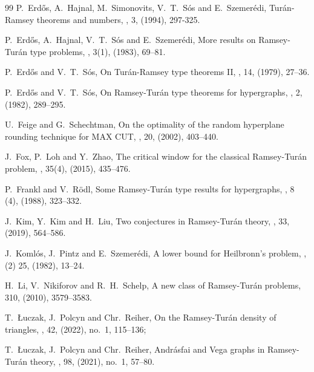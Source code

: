 \documentclass[11pt, a4paper]{article}
\theoremstyle{definition}
\begin{document}
\begin{thebibliography}{99}
P.~Erd\H os, A.~Hajnal, M.~Simonovits, V.~T.~S\'os and E.~Szemer\'edi,
\newblock Tur\'an-Ramsey theorems and  numbers,
, 3, (1994), 297-325.

P.~Erd\H os, A.~Hajnal, V.~T.~S\'os and E.~Szemer\'edi,
\newblock More results on Ramsey-Tur\'an type problems,
, 3(1), (1983), 69--81.

P.~Erd\H os and V.~T.~S\'os,
\newblock On Tur\'an-Ramsey type theorems II,
, 14, (1979), 27--36.

P.~Erd\H os and V.~T.~S\'os,
\newblock On Ramsey-Tur\'an type theorems for hypergraphs,
, 2, (1982), 289--295.

U.~Feige and G.~Schechtman,
\newblock On the optimality of the random hyperplane rounding technique for MAX CUT,
, 20, (2002), 403--440.

J.~Fox, P.~Loh and Y.~Zhao,
\newblock The critical window for the classical {R}amsey-{T}ur\'{a}n problem,
, 35(4), (2015), 435--476.

P.~Frankl and V.~R\"odl,
\newblock Some Ramsey-Tur\'an type results for hypergraphs,
, 8 (4), (1988), 323--332.

J.~Kim, Y.~Kim and H.~Liu,
\newblock Two conjectures in Ramsey-Tur\'an theory,
, 33, (2019), 564--586.

J.~Koml\'os, J.~Pintz and E.~Szemer\'edi,
\newblock A lower bound for Heilbronn's problem,
, (2) 25, (1982), 13--24.

H.~Li, V.~Nikiforov and R.~H.~Schelp,
\newblock A new class of Ramsey-Tur\'an problems,
 310, (2010), 3579--3583.

T.~{\L}uczak, J.~Polcyn and Chr.~Reiher,
\newblock On the Ramsey-Tur\'an density of triangles,
, 42, (2022), no.~1, 115--136;



T.~{\L}uczak, J.~Polcyn and Chr.~Reiher,
\newblock Andr\'asfai and Vega graphs in Ramsey-Tur\'an theory,
, 98, (2021), no.~1, 57--80.


\end{thebibliography}
\end{document}
